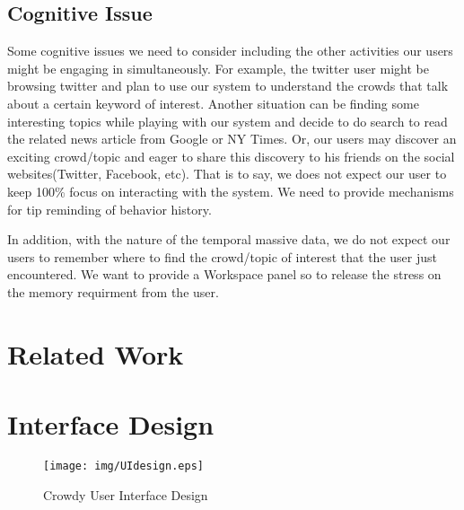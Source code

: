 \documentclass{sig-alternate}
\begin{document}
\subsection{Cognitive Issue}
Some cognitive issues we need to consider including the other activities our users might be engaging in simultaneously. For example, the twitter user might be browsing twitter and plan to use our system to understand the crowds that talk about a certain keyword of interest. Another situation can be finding some interesting topics while playing with our system and decide to do search to read the related news article from Google or NY Times. Or, our users may discover an exciting crowd/topic and eager to share this discovery to his friends on the social websites(Twitter, Facebook, etc). That is to say, we does not expect our user to keep 100\% focus on interacting with the system. We need to provide mechanisms for tip reminding of behavior history. 

In addition, with the nature of the temporal massive data, we do not expect our users to remember where to find the crowd/topic of interest that the user just encountered. We want to provide a Workspace panel so to release the stress on the memory requirment from the user.

\section{Related Work}

\section{Interface Design}

\begin{figure*}[t]
\centering
\texttt{[image: img/UIdesign.eps]}
\caption{Crowdy User Interface Design}
\label{fig:UIdesign}
\end{figure*}
\end{document}
